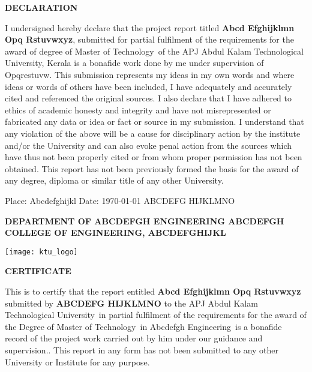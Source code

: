 \documentclass[12pt,a4paper]{report}
\def \reptitle{Abcd Efghijklmn Opq Rstuvwxyz}
\def \repauthor{ABCDEFG HIJKLMNO}
\def \repdegree{Master of Technology}
\def \repbranch{Abcdefgh Engineering}
\def \repcollege{Abcdefgh College Of Engineering}
\def \repplace{Abcdefghijkl}
\def \repsupervisor{Opqrestuvw}
\def \repuniversity{APJ Abdul Kalam Technological University}
\begin{document}
\clearpage
{}

\center\textbf{\Large DECLARATION}
\break

\justify 
{}I undersigned hereby declare that the project report titled \textbf{\reptitle}, submitted for partial fulfilment of the requirements for the award of degree of \repdegree\, of the \repuniversity, Kerala is a bonafide work done by me under supervision of \repsupervisor. This submission represents my ideas in my own words and where ideas or words of others have been included, I have adequately and accurately cited and referenced the original sources. I also declare that I have adhered to ethics of academic honesty and integrity and have not misrepresented or fabricated any data or idea or fact or source in my submission. I understand that any violation of the above will be a cause for disciplinary action by the institute and/or the University and can also evoke penal action from the sources which have thus not been properly cited or from whom proper permission has not been obtained. This report has not been previously formed the basis for the award of any degree, diploma or similar title of any other University.

\vspace{5cm} %
\begin{flushleft}
Place: \repplace \break
Date: \today 
\hfill \repauthor %
\end{flushleft}

\newpage 

\center\textbf{\large \MakeUppercase{department of \repbranch } \break
\MakeUppercase{\repcollege, \repplace}}

\texttt{[image: ktu\_logo]}\par

\center\textbf{\Large CERTIFICATE}

\justify
This is to certify that the report entitled \textbf{\large \reptitle} submitted by \textbf{\repauthor} to the \repuniversity\, in partial fulfilment of the requirements for the award of the Degree of \repdegree\, in \repbranch\,  is a bonafide record of the project work carried out by him under our guidance and supervision.. This report in any form has not been submitted to any other University or Institute for any purpose.
\end{document}
